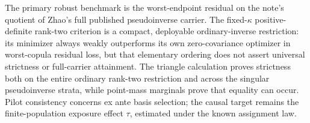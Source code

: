 The primary robust benchmark is the worst-endpoint residual on the note's quotient of Zhao's full published pseudoinverse carrier.  The fixed-\(\kappa\) positive-definite rank-two criterion is a compact, deployable ordinary-inverse restriction: its minimizer always weakly outperforms its own zero-covariance optimizer in worst-copula residual loss, but that elementary ordering does not assert universal strictness or full-carrier attainment.  The triangle calculation proves strictness both on the entire ordinary rank-two restriction and across the singular pseudoinverse strata, while point-mass marginals prove that equality can occur.  Pilot consistency concerns ex ante basis selection; the causal target remains the finite-population exposure effect \(\tau\), estimated under the known assignment law.